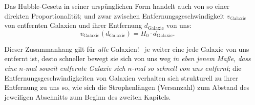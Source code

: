 Das Hubble-Gesetz in seiner urspünglichen Form handelt auch von so einer
  direkten Proportionalität; und zwar zwischen Entfernungsgeschwindigkeit
  $v_{\text{Galaxie}}$ von entfernten Galaxien und ihrer Entfernung
  $d_{\text{Galaxie}}$ von uns:
  \begin{equation}
    v_{\text{Galaxie}}(d_{\text{Galaxie}}) = H_{0} \cdot d_{\text{Galaxie}}\text{.}
  \end{equation}

Dieser Zusammanhang gilt für \emph{alle} Galaxien! \Dhei\ je weiter eine jede
  Galaxie von uns entfernt ist, desto schneller bewegt sie sich von uns weg
  \emph{in eben jenem Maße, dass eine $n$-mal soweit entfernte Galaxie sich
  $n$-mal so schnell von uns entfernt}; die Entfernungsgeschwindigkeiten von
  Galaxien verhalten sich strukturell zu ihrer Entfernung zu uns so, wie sich
  die Strophenlängen (Versanzahl) zum Abstand des jeweiligen Abschnitts zum
  Beginn des zweiten Kapitels.

